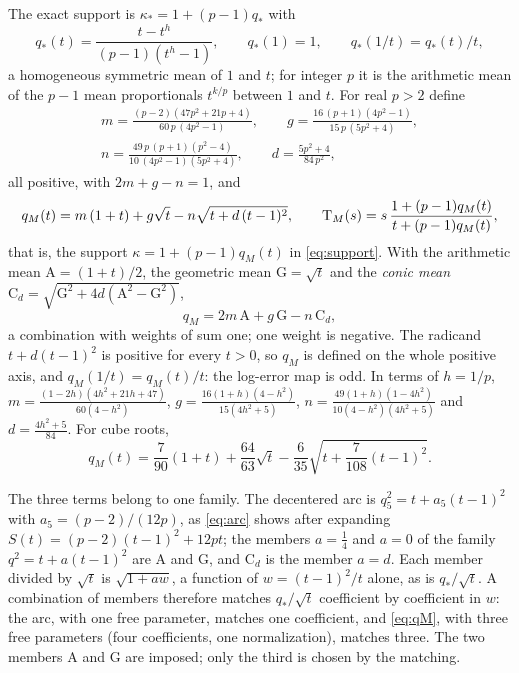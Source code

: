 The exact support is $\kappa_*=1+(p-1)q_*$ with
\[ q_*(t)=\frac{t-t^{h}}{(p-1)(t^{h}-1)},\qquad q_*(1)=1,\qquad q_*(1/t)=q_*(t)/t , \]
a homogeneous symmetric mean of $1$ and $t$; for integer $p$ it is the arithmetic mean of the $p-1$
mean proportionals $t^{k/p}$ between $1$ and $t$. For real $p>2$ define
\begin{equation}\label{eq:mcoeff}
\begin{gathered}
m=\frac{(p-2)(47p^{2}+21p+4)}{60\,p\,(4p^{2}-1)},\qquad
g=\frac{16\,(p+1)(4p^{2}-1)}{15\,p\,(5p^{2}+4)},\\[2pt]
n=\frac{49\,p\,(p+1)(p^{2}-4)}{10\,(4p^{2}-1)(5p^{2}+4)},\qquad
d=\frac{5p^{2}+4}{84\,p^{2}} ,
\end{gathered}
\end{equation}
all positive, with $2m+g-n=1$, and
\begin{equation}\label{eq:qM}
q_M(t)=m\,(1+t)+g\sqrt t-n\sqrt{t+d\,(t-1)^{2}},\qquad
\mathrm{T}_{M}(s)=s\,\frac{1+(p-1)q_M(t)}{t+(p-1)q_M(t)},
\end{equation}
that is, the support $\kappa=1+(p-1)q_M(t)$ in \eqref{eq:support}. With the arithmetic mean
$\mathrm A=(1+t)/2$, the geometric mean $\mathrm G=\sqrt t$ and the \emph{conic mean}
$\mathrm C_d=\sqrt{\mathrm G^{2}+4d(\mathrm A^{2}-\mathrm G^{2})}$,
\[ q_M=2m\,\mathrm A+g\,\mathrm G-n\,\mathrm C_d , \]
a combination with weights of sum one; one weight is negative. The radicand $t+d(t-1)^{2}$ is positive
for every $t>0$, so $q_M$ is defined on the whole positive axis, and $q_M(1/t)=q_M(t)/t$: the log-error
map is odd. In terms of $h=1/p$,
$m=\frac{(1-2h)(4h^{2}+21h+47)}{60(4-h^{2})}$, $g=\frac{16(1+h)(4-h^{2})}{15(4h^{2}+5)}$,
$n=\frac{49(1+h)(1-4h^{2})}{10(4-h^{2})(4h^{2}+5)}$ and $d=\frac{4h^{2}+5}{84}$. For cube roots,
\begin{equation}\label{eq:qMcubic}
q_M(t)=\frac{7}{90}(1+t)+\frac{64}{63}\sqrt t-\frac{6}{35}\sqrt{t+\frac{7}{108}(t-1)^{2}} .
\end{equation}

The three terms belong to one family. The decentered arc is $q_5^{2}=t+a_5(t-1)^{2}$ with
$a_5=(p-2)/(12p)$, as \eqref{eq:arc} shows after expanding $S(t)=(p-2)(t-1)^{2}+12pt$; the members
$a=\tfrac14$ and $a=0$ of the family $q^{2}=t+a(t-1)^{2}$ are $\mathrm A$ and $\mathrm G$, and
$\mathrm C_d$ is the member $a=d$. Each member divided by $\sqrt t$ is $\sqrt{1+aw}$, a function of
$w=(t-1)^{2}/t$ alone, as is $q_*/\sqrt t$. A combination of members therefore matches $q_*/\sqrt t$
coefficient by coefficient in $w$: the arc, with one free parameter, matches one coefficient, and
\eqref{eq:qM}, with three free parameters (four coefficients, one normalization), matches three. The two
members $\mathrm A$ and $\mathrm G$ are imposed; only the third is chosen by the matching.

